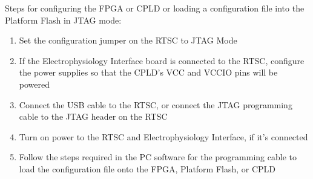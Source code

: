 Steps for configuring the FPGA or CPLD or loading a configuration file into the Platform Flash in JTAG mode:

\begin{enumerate}
	\item Set the configuration jumper on the RTSC to JTAG Mode

	\item If the Electrophysiology Interface board is connected to the RTSC, configure the power supplies so that the CPLD's VCC and VCCIO pins will be powered

	\item Connect the USB cable to the RTSC, or connect the JTAG programming cable to the JTAG header on the RTSC

	\item Turn on power to the RTSC and Electrophysiology Interface, if it's connected

	\item Follow the steps required in the PC software for the programming cable to load the configuration file onto the FPGA, Platform Flash, or CPLD
\end{enumerate}
